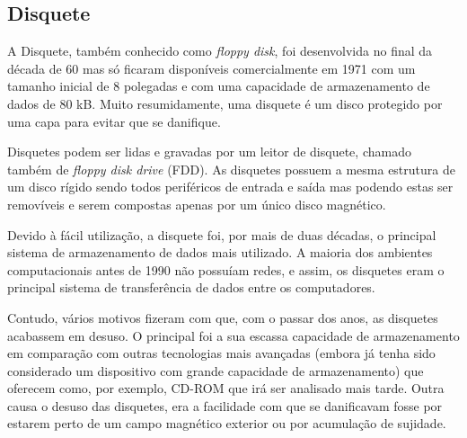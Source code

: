 \documentclass{report}
\begin{document}
		\subsection{Disquete}
		A Disquete, também conhecido como \textit{floppy disk}, foi desenvolvida no final da década de 60 mas só ficaram disponíveis comercialmente em 1971 com um tamanho inicial de 8 polegadas e com uma capacidade de armazenamento de dados de 80 kB. Muito resumidamente, uma disquete é um disco protegido por uma capa para evitar que se danifique. 
\vspace{1mm}

		Disquetes podem ser lidas e gravadas por um leitor de disquete, chamado também de \textit{floppy disk drive} (FDD). As disquetes possuem a mesma estrutura de um disco rígido sendo todos periféricos de entrada e saída mas podendo estas ser removíveis e serem compostas apenas por um único disco magnético.
\vspace{1mm}
		
		 Devido à fácil utilização, a disquete foi, por mais de duas décadas, o principal sistema de armazenamento de dados mais utilizado. A maioria dos ambientes computacionais antes de 1990 não possuíam redes, e assim, os disquetes eram o principal sistema de transferência de dados entre os computadores.
\vspace{1mm}
		
		Contudo, vários motivos fizeram com que, com o passar dos anos, as disquetes acabassem em desuso. O principal foi a sua escassa capacidade de armazenamento em comparação com outras tecnologias mais avançadas (embora já tenha sido considerado um dispositivo com grande capacidade de armazenamento) que oferecem como, por exemplo, CD-ROM que irá ser analisado mais tarde. Outra causa o desuso das disquetes, era a facilidade com que se danificavam fosse por estarem perto de um campo magnético exterior ou por acumulação de sujidade.
		
\end{document}
